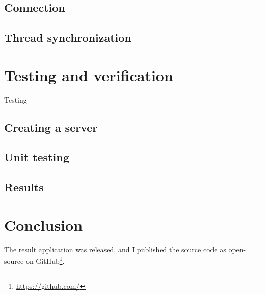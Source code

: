 \section{Connection}

\section{Thread synchronization}

\chapter{Testing and verification}
\label{ch7}
Testing

\section{Creating a server}

\section{Unit testing}

\section{Results}


\chapter{Conclusion}
\label{ch8}

The result application was released, and I published the source code as open-source on GitHub\footnote{\url{https://github.com/}}.

 